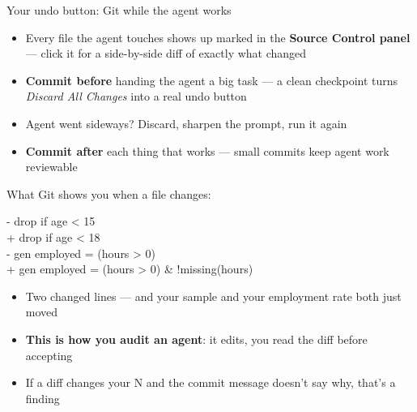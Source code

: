 \documentclass[aspectratio=169, 10pt]{beamer}
\newcommand{\aside}[2][4.2cm]{%
\begin{tikzpicture}[remember picture, overlay]
  \pgfmathsetseed{4242}%
  \node[anchor=south east, xshift=-1.5cm, yshift=0.6cm,
        fill=LightGold, rounded corners=9pt,
        text=DeepCharcoal, font=\asidefont, align=left,
        text width=#1, inner sep=9pt]
    (asidebox) at (current page.south east) {#2};
  \draw[DeepCharcoal, line width=1.0pt, rounded corners=11pt,
        decorate, decoration={random steps, segment length=10pt, amplitude=1.2pt}]
    ($(asidebox.south west)+(-2pt,-2pt)$) rectangle ($(asidebox.north east)+(2pt,2pt)$);
  \draw[DeepCharcoal!70, line width=0.6pt, rounded corners=10pt,
        decorate, decoration={random steps, segment length=14pt, amplitude=1.8pt}]
    ($(asidebox.south west)+(-3pt,-1pt)$) rectangle ($(asidebox.north east)+(1pt,3pt)$);
\end{tikzpicture}}
\begin{document}
\begin{frame}{Your undo button: Git while the agent works}

\begin{itemize}
  \item Every file the agent touches shows up marked in the \textbf{Source Control panel} --- click it for a side-by-side diff of exactly what changed
  \item \textbf{Commit before} handing the agent a big task --- a clean checkpoint turns \emph{Discard All Changes} into a real undo button
  \item Agent went sideways? Discard, sharpen the prompt, run it again
  \item \textbf{Commit after} each thing that works --- small commits keep agent work reviewable
\end{itemize}

\vspace{0.3cm}



\end{frame}

\begin{frame}[fragile]{What Git shows you when a file changes:
}

\begin{tcolorbox}[codebox]
\footnotesize\ttfamily
\color{SoftCoral}- drop if age < 15\\
\color{white}+ drop if age < 18\\[4pt]
\color{SoftCoral}- gen employed = (hours > 0)\\
\color{white}+ gen employed = (hours > 0) \& !missing(hours)
\end{tcolorbox}

\vspace{0.3cm}

\begin{itemize}
  \item Two changed lines --- and your sample and your employment rate both just moved
  \item \textbf{This is how you audit an agent}: it edits, you read the diff before accepting
  \item If a diff changes your N and the commit message doesn't say why, that's a finding
\end{itemize}

\end{frame}
\end{document}

